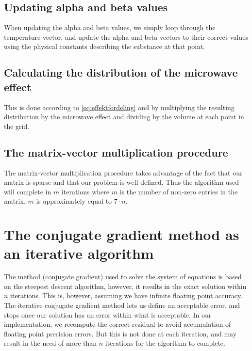 \subsection{Updating alpha and beta values}

When updating the alpha and beta values, we simply loop through the temperature
vector, and update the alpha and beta vectors to their correct values using the
physical constants describing the substance at that point.

\subsection{Calculating the distribution of the microwave effect}

This is done according to \cref{eq:effektfordeling} and by multiplying the
resulting distribution by the microwave effect and dividing by the volume at each point
in the grid.

\subsection{The matrix-vector multiplication procedure}

The matrix-vector multiplication procedure takes advantage of the fact that our 
matrix is sparse and that our problem is well defined. Thus the algorithm used
will complete in $m$ iterations where $m$ is the number of non-zero entries in 
the matrix. $m$ is approximately equal to $7\cdot n$.

\section{The conjugate gradient method as an iterative algorithm}

The method (conjugate gradient) used to solve the system of equations is based on 
the steepest descent algorithm, however, it results in the exact solution within
$n$ iterations. This is, however, assuming we have infinite floating point
accuracy. \\

The iterative conjugate gradient method lets us define an acceptable error, and stops
once our solution has an error within what is acceptable.
In our implementation, we recompute the correct residual to avoid accumulation of
floating point precision errors. But this is not done at each iteration, and may
result in the need of more than $n$ iterations for the algorithm to complete.

